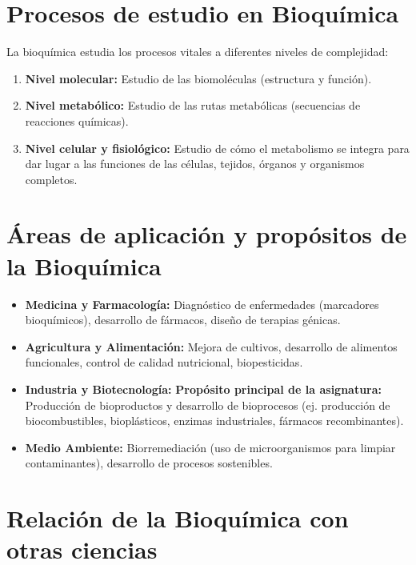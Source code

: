 \section{Procesos de estudio en Bioquímica}

La bioquímica estudia los procesos vitales a diferentes niveles de complejidad:
\begin{enumerate}
    \item \textbf{Nivel molecular:} Estudio de las biomoléculas (estructura y función).
    \item \textbf{Nivel metabólico:} Estudio de las rutas metabólicas (secuencias de reacciones químicas).
    \item \textbf{Nivel celular y fisiológico:} Estudio de cómo el metabolismo se integra para dar lugar a las funciones de las células, tejidos, órganos y organismos completos.
\end{enumerate}

\section{Áreas de aplicación y propósitos de la Bioquímica}

\begin{itemize}
    \item \textbf{Medicina y Farmacología:} Diagnóstico de enfermedades (marcadores bioquímicos), desarrollo de fármacos, diseño de terapias génicas.
    \item \textbf{Agricultura y Alimentación:} Mejora de cultivos, desarrollo de alimentos funcionales, control de calidad nutricional, biopesticidas.
    \item \textbf{Industria y Biotecnología:} \textbf{Propósito principal de la asignatura:} Producción de bioproductos y desarrollo de bioprocesos (ej. producción de biocombustibles, bioplásticos, enzimas industriales, fármacos recombinantes).
    \item \textbf{Medio Ambiente:} Biorremediación (uso de microorganismos para limpiar contaminantes), desarrollo de procesos sostenibles.
\end{itemize}

\section{Relación de la Bioquímica con otras ciencias}

